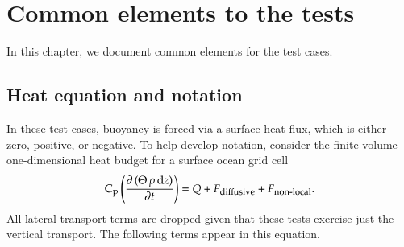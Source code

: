 \chapter{Common elements to the tests}
\label{chapter:common_elements}

In this chapter, we document common elements for the test cases.

\minitoc


\section{Heat equation and notation}

In these test cases, buoyancy is forced via a surface heat flux, which
is either zero, positive, or negative.  To help develop notation,
consider the finite-volume one-dimensional heat budget for a surface
ocean grid cell
\begin{equation}
  \mbox{C}_{\mbox{\footnotesize p}} \left(   \frac{\partial  \, (\Theta \, \rho \, \mathrm{d}z )}{\partial t}  \right) =  
  Q + F_{\mbox{\footnotesize diffusive}} + F_{\mbox{\footnotesize non-local}}.
\label{eq:surface-heat-equation}
\end{equation}
All lateral transport terms are dropped given that these tests
exercise just the vertical transport.  The following terms appear in
this equation.
